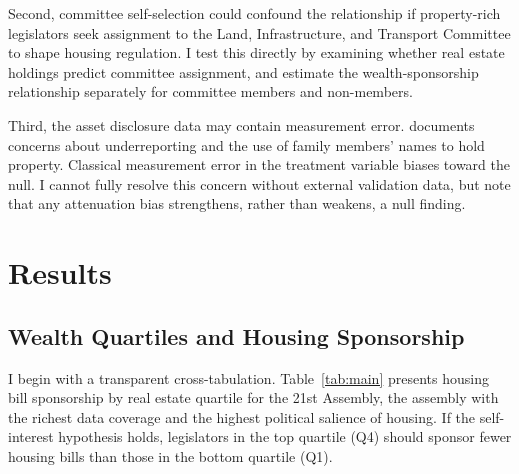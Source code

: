 \documentclass[11pt]{article}
\begin{document}
Second, committee self-selection could confound the relationship if property-rich legislators seek assignment to the Land, Infrastructure, and Transport Committee to shape housing regulation. I test this directly by examining whether real estate holdings predict committee assignment, and estimate the wealth-sponsorship relationship separately for committee members and non-members.

Third, the asset disclosure data may contain measurement error. \citet{jung2020} documents concerns about underreporting and the use of family members' names to hold property. Classical measurement error in the treatment variable biases toward the null. I cannot fully resolve this concern without external validation data, but note that any attenuation bias strengthens, rather than weakens, a null finding.


\section{Results}
\label{sec:results}

\subsection{Wealth Quartiles and Housing Sponsorship}

I begin with a transparent cross-tabulation. Table~\ref{tab:main} presents housing bill sponsorship by real estate quartile for the 21st Assembly, the assembly with the richest data coverage and the highest political salience of housing. If the self-interest hypothesis holds, legislators in the top quartile (Q4) should sponsor fewer housing bills than those in the bottom quartile (Q1).
\end{document}
